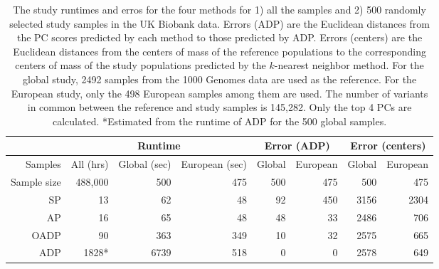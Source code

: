 \documentclass{article}
\begin{document}
\begin{table}[H]
  \centering
  \begin{tabular}{|r|r|r|r|r|r|r|r|}
    \hline
    & \multicolumn{3}{|c|}{Runtime} & \multicolumn{2}{|c|}{Error (ADP)} & \multicolumn{2}{|c|}{Error (centers)} \\
    \hline
    Samples & All (hrs) & Global (sec) & European (sec) & Global & European & Global & European \\
    \hline
    Sample size & 488,000 & 500 & 475 & 500 & 475 & 500 & 475 \\
    \hline
    SP   & 13    &  62   & 48  & 92  & 450 & 3156 & 2304 \\ 
    AP   & 16    &  65   & 48  & 48  & 33  & 2486 & 706  \\
    OADP & 90    &  363  & 349 & 10  & 32  & 2575 & 665  \\
    ADP  & 1828*  &  6739 & 518 & 0   & 0   & 2578 & 649  \\
    \hline
  \end{tabular}
  \caption{
    The study runtimes and erros for the four methods
    for 1) all the samples and 2) 500 randomly selected study samples
    in the UK Biobank data.
    Errors (ADP) are the Euclidean distances from
    the PC scores predicted by each method
    to those predicted by ADP.
    Errors (centers) are the Euclidean distances
    from the centers of mass of the reference populations
    to the corresponding centers of mass of the study populations
    predicted by the $k$-nearest neighbor method.
    For the global study,
    2492 samples from the 1000 Genomes data are used as the reference.
    For the European study,
    only the 498 European samples among them are used.
    The number of variants
    in common between the reference and study samples is 145,282.
    Only the top 4 PCs are calculated.
    *Estimated from the runtime of ADP for the 500 global samples.
    }
\end{table}
\end{document}
